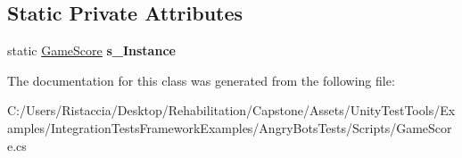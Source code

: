 \subsection*{Static Private Attributes}
\begin{DoxyCompactItemize}
\item 
\mbox{\label{class_game_score_adf3279ec8e20afdc4f8d94fa712bf1a5}} 
static \hyperlink{class_game_score}{Game\+Score} {\bfseries s\+\_\+\+Instance}
\end{DoxyCompactItemize}


The documentation for this class was generated from the following file\+:\begin{DoxyCompactItemize}
\item 
C\+:/\+Users/\+Ristaccia/\+Desktop/\+Rehabilitation/\+Capstone/\+Assets/\+Unity\+Test\+Tools/\+Examples/\+Integration\+Tests\+Framework\+Examples/\+Angry\+Bots\+Tests/\+Scripts/Game\+Score.\+cs\end{DoxyCompactItemize}
